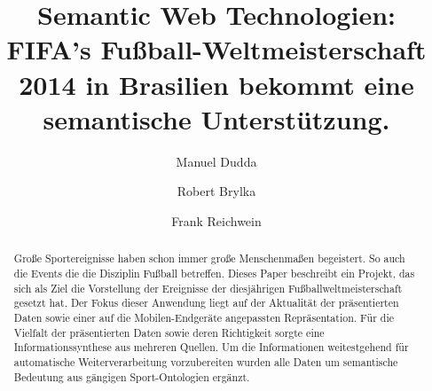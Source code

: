 \documentclass[runningheads,a4paper]{llncs}
\begin{document}
\mainmatter  %

\title{Semantic Web Technologien:\\FIFA's Fu\ss ball-Weltmeisterschaft 2014 in Brasilien bekommt eine semantische Unterst\"utzung.}


%
%
\author{Manuel Dudda \and Robert Brylka\and Frank Reichwein}
%


%
%

\maketitle


\begin{abstract}
Große Sportereignisse haben schon immer große Menschenmaßen begeistert. So auch die Events die die Disziplin Fußball betreffen. Dieses Paper beschreibt ein Projekt, das sich als Ziel die Vorstellung der Ereignisse der diesjährigen Fußballweltmeisterschaft gesetzt hat. Der Fokus dieser Anwendung liegt auf der Aktualität der präsentierten Daten sowie einer auf die Mobilen-Endgeräte angepassten Repräsentation. Für die Vielfalt der präsentierten Daten sowie deren Richtigkeit sorgte eine Informationssynthese aus mehreren Quellen. Um die Informationen weitestgehend für automatische Weiterverarbeitung vorzubereiten wurden alle Daten um semantische Bedeutung aus gängigen Sport-Ontologien ergänzt.
\end{abstract}
\end{document}

